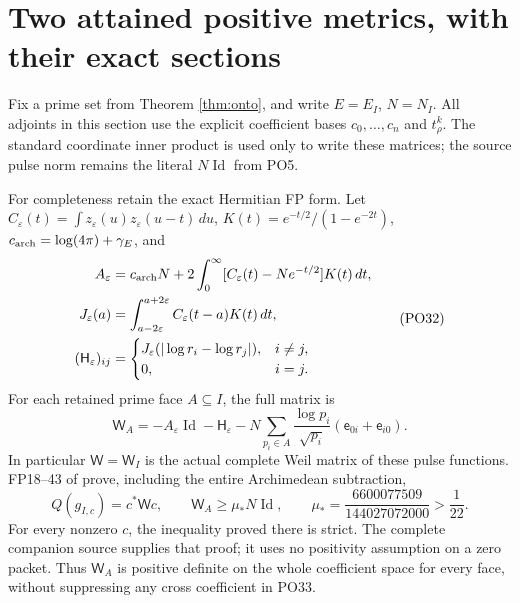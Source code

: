 \documentclass[11pt]{article}
\newcommand{\eps}{\varepsilon}
\newcommand{\Id}{\operatorname{Id}}
\begin{document}
\section{Two attained positive metrics, with their exact sections}

Fix a prime set from Theorem \ref{thm:onto}, and write
\(E=E_I\), \(N=N_I\). All adjoints in this section use the
explicit coefficient bases \(c_0,\ldots,c_n\) and
\(t_\rho^k\). The standard coordinate inner product is used
only to write these matrices; the source pulse norm remains
the literal \(N\Id\) from PO5.

For completeness retain the exact Hermitian FP form.
Let \(C_\eps(t)=\int z_\eps(u)z_\eps(u-t)\,du\),
\(K(t)=e^{-t/2}/(1-e^{-2t})\),
\(c_{\rm arch}=\log(4\pi)+\gamma_E\), and
\[
 \begin{aligned}
 A_\eps&=c_{\rm arch}N+
       2\int_0^\infty[C_\eps(t)-Ne^{-t/2}]K(t)\,dt,\\
 J_\eps(a)&=\int_{a-2\eps}^{a+2\eps}C_\eps(t-a)K(t)\,dt,\\
 (\mathsf H_\eps)_{ij}
   &=\begin{cases}J_\eps(|\log r_i-\log r_j|),&i\ne j,\\0,&i=j.\end{cases}
 \end{aligned}
 \tag{PO32}
\]
For each retained prime face \(A\subseteq I\), the full matrix is
\[
 \mathsf W_A=-A_\eps\Id-\mathsf H_\eps
    -N\sum_{p_i\in A}\frac{\log p_i}{\sqrt{p_i}}
                         (\mathsf e_{0i}+\mathsf e_{i0}).
 \tag{PO33}\label{po:FPmatrix}
\]
In particular \(\mathsf W=\mathsf W_I\) is the actual complete
Weil matrix of these pulse functions. FP18--43 of \cite{FP}
prove, including the entire Archimedean subtraction,
\[
 Q(g_{I,c})=c^*\mathsf Wc,\qquad
 \mathsf W_A\ge\mu_*N\Id,\qquad
 \mu_*=\frac{6600077509}{144027072000}>\frac1{22}.
 \tag{PO34}\label{po:coercive}
\]
For every nonzero \(c\), the inequality proved there is strict.
The complete companion source supplies that proof; it uses no
positivity assumption on a zero packet.
Thus \(\mathsf W_A\) is positive definite on the whole
coefficient space for every face, without suppressing any
cross coefficient in PO33.
\end{document}
